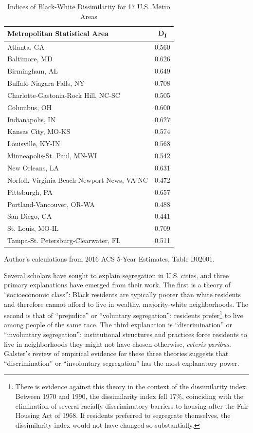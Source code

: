 \documentclass[paper=letter, fontsize=12pt]{scrartcl} %
\begin{document}
\begin{table}[h]
	\caption{Indices of Black-White Dissimilarity for 17 U.S. Metro Areas}
	\begin{center}
		\begin{tabular}{||l | c||}
			\hline
			\textbf{Metropolitan Statistical Area} & \textbf{D\textsubscript{I}} \\
			\hline \hline
			Atlanta, GA & 0.560 \\
			\hline
			Baltimore, MD & 0.626 \\
			\hline
			Birmingham, AL & 0.649 \\
			\hline
			Buffalo-Niagara Falls, NY & 0.708 \\
			\hline
			Charlotte-Gastonia-Rock Hill, NC-SC & 0.505 \\
			\hline
			Columbus, OH & 0.600 \\
			\hline
			Indianapolis, IN & 0.627 \\
			\hline
			Kansas City, MO-KS & 0.574 \\
			\hline
			Louisville, KY-IN & 0.568 \\
			\hline
			Minneapolis-St. Paul, MN-WI & 0.542 \\
			\hline
			New Orleans, LA & 0.631 \\
			\hline
			Norfolk-Virginia Beach-Newport News, VA-NC & 0.472 \\
			\hline
			Pittsburgh, PA & 0.657 \\
			\hline
			Portland-Vancouver, OR-WA & 0.488 \\
			\hline
			San Diego, CA & 0.441 \\
			\hline
			St. Louis, MO-IL & 0.709 \\
			\hline
			Tampa-St. Petersburg-Clearwater, FL & 0.511 \\
			\hline
		\end{tabular}
	\end{center}
Author's calculations from 2016 ACS 5-Year Estimates, Table B02001.
\end{table}

Several scholars have sought to explain segregation in U.S. cities, and three primary explanations have emerged from their work. The first is a theory of ``socioeconomic class'': Black residents are typically poorer than white residents and therefore cannot afford to live in wealthy, majority-white neighborhoods. The second is that of ``prejudice'' or ``voluntary segregation'': residents prefer\footnote{There is evidence against this theory in the context of the dissimilarity index. Between 1970 and 1990, the dissimilarity index fell 17\%, coinciding with the elimination of several racially discriminatory barriers to housing after the Fair Housing Act of 1968. \cite{goering2} If residents preferred to segregrate themselves, the dissimilarity index would not have changed so substantially.} to live among people of the same race. The third explanation is ``discrimination'' or ``involuntary segregation'': institutional structures and practices force residents to live in neighborhoods they might not have chosen otherwise, \textit{ceteris paribus}. Galster's review of empirical evidence for these three theories suggests that ``discrimination'' or ``involuntary segregation'' has the most explanatory power. \cite{goering}
\end{document}
